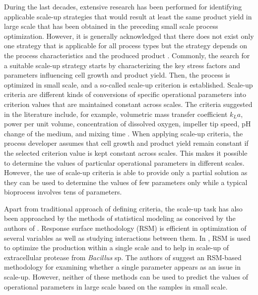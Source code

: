 \documentclass{article}
\begin{document}
During the last decades, extensive research has been performed \cite{ScaleUp_MLSP:junker04, ScaleUp_MLSP:schmidt05} for identifying applicable scale-up strategies that would result at least the same product yield in large scale that has been obtained in the preceding small scale process optimization. However, it is generally acknowledged that there does not exist only one strategy that is applicable for all process types but the strategy depends on the process characteristics and the produced product \cite{ScaleUp_MLSP:schmidt05}. Commonly, the search for a suitable scale-up strategy starts by characterizing the key stress factors and parameters influencing cell growth and product yield. Then, the process is optimized in small scale, and a so-called scale-up criterion is established. Scale-up criteria are different kinds of conversions of specific operational parameters into criterion values that are maintained constant across scales. The criteria suggested in the literature include, for example, volumetric mass transfer coefficient ${k_{L}a}$, power per unit volume, concentration of dissolved oxygen, impeller tip speed, pH change of the medium, and mixing time \cite{ScaleUp_MLSP:garcia09, ScaleUp_MLSP:katzer01, ScaleUp_MLSP:marques10, %
ScaleUp_MLSP:rocha06, ScaleUp_MLSP:seletzky07}. When applying scale-up criteria, the process developer assumes that cell growth and product yield remain constant if the selected criterion value is kept constant across scales. This makes it possible to determine the values of particular operational parameters in different scales. However, the use of scale-up criteria is able to provide only a partial solution as they can be used to determine the values of few parameters only while a typical bioprocess involves tens of parameters. 

Apart from %
traditional approach of defining criteria, the scale-up task has also been approached by the methods of statistical modeling as conceived by the authors of \cite{ScaleUp_MLSP:hsu02, ScaleUp_MLSP:ogawa94, ScaleUp_MLSP:saran07}. Response surface methodology (RSM) is efficient in optimization of several variables as well as studying interactions between them. In \cite{ScaleUp_MLSP:saran07}, RSM is used to optimize the production within a single scale and to help in %
scale-up of extracellular protease from \textit{Bacillus} sp. The authors of \cite{ScaleUp_MLSP:hsu02} suggest an RSM-based methodology for examining whether a single parameter %
appears as an issue in scale-up. However, neither of these methods can be used to predict the values of operational parameters in large scale based on the samples in small scale. 
\end{document}
